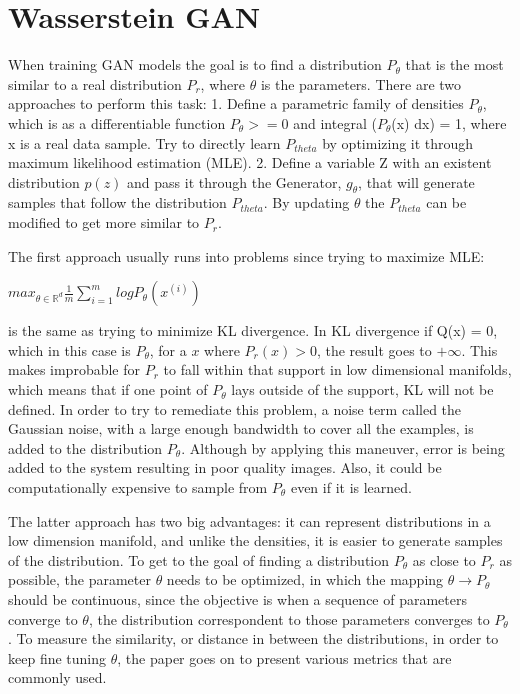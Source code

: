 
\section{Wasserstein GAN}

When training GAN models the goal is to find a distribution $P_{\theta}$ that is the most similar to a real distribution $P_{r}$, where $\theta$ is the parameters. There are two approaches to perform this task:
1. Define a parametric family of densities $P_{\theta}$, which is as a differentiable function $P_{\theta} >= 0$ and integral ($P_{\theta}$(x) dx) = 1, where x is a real data sample. Try to directly learn $P_{theta}$ by optimizing it through maximum likelihood estimation (MLE).
2. Define a variable Z with an existent distribution $p(z)$ and pass it through the Generator, $g_{\theta}$, that will generate samples that follow the distribution $P_{theta}$. By updating $\theta$ the $P_{theta}$ can be modified to get more similar to $P_{r}$.

The first approach usually runs into problems since trying to maximize MLE:
\begin{center}
	$max_{\theta\in \mathbb{R}^{d}} \frac{1}{m} \sum_{i=1}^{m} log P_{\theta}(x^{(i)})$
\end{center}
is the same as trying to minimize KL divergence.
In KL divergence if Q(x) = 0, which in this case is $P_{\theta}$, for a $x$ where $P_{r}(x) > 0$, the result goes to $+\infty$. This makes improbable for $P_{r}$ to fall within that support in low dimensional manifolds, which means that if one point of $P_{\theta}$ lays outside of the support, KL will not be defined. In order to try to remediate this problem, a noise term called the Gaussian noise, with a large enough bandwidth to cover all the examples, is added to the distribution $P_{\theta}$. Although by applying this maneuver, error is being added to the system resulting in poor quality images. Also, it could be computationally expensive to sample from $P_{\theta}$ even if it is learned.

The latter approach has two big advantages: it can represent distributions in a low dimension manifold, and unlike the densities, it is easier to generate samples of the distribution. To get to the goal of finding a distribution  $P_{\theta}$ as close to $P_{r}$ as possible, the parameter $\theta$ needs to be optimized, in which the mapping $\theta \rightarrow P_{\theta}$ should be continuous, since the objective is when a sequence of parameters converge to $\theta$, the distribution correspondent to those parameters converges to $P_{\theta}$. To measure the similarity, or distance in between the distributions, in order to keep fine tuning $\theta$, the paper goes on to present various metrics that are commonly used. 

